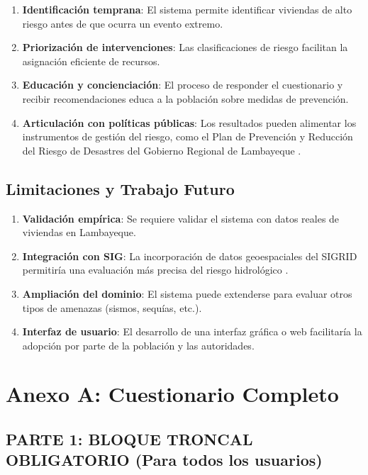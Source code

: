 \documentclass[12pt, letterpaper]{article}
\begin{document}
\begin{enumerate}
  \item \textbf{Identificación temprana}: El sistema permite identificar viviendas de alto riesgo antes de que ocurra un evento extremo.
  \item \textbf{Priorización de intervenciones}: Las clasificaciones de riesgo facilitan la asignación eficiente de recursos.
  \item \textbf{Educación y concienciación}: El proceso de responder el cuestionario y recibir recomendaciones educa a la población sobre medidas de prevención.
  \item \textbf{Articulación con políticas públicas}: Los resultados pueden alimentar los instrumentos de gestión del riesgo, como el Plan de Prevención y Reducción del Riesgo de Desastres del Gobierno Regional de Lambayeque \parencite{gob_regional_lambayeque_2023}.
\end{enumerate}

\subsection{Limitaciones y Trabajo Futuro}

\begin{enumerate}
  \item \textbf{Validación empírica}: Se requiere validar el sistema con datos reales de viviendas en Lambayeque.
  \item \textbf{Integración con SIG}: La incorporación de datos geoespaciales del SIGRID permitiría una evaluación más precisa del riesgo hidrológico \parencite{cenepred_manual_evar}.
  \item \textbf{Ampliación del dominio}: El sistema puede extenderse para evaluar otros tipos de amenazas (sismos, sequías, etc.).
  \item \textbf{Interfaz de usuario}: El desarrollo de una interfaz gráfica o web facilitaría la adopción por parte de la población y las autoridades.
\end{enumerate}

\clearpage 
{} 
{}
\printbibliography


\newpage
\appendix
\section{Anexo A: Cuestionario Completo}

\subsection*{PARTE 1: BLOQUE TRONCAL OBLIGATORIO (Para todos los usuarios)}
\end{document}
